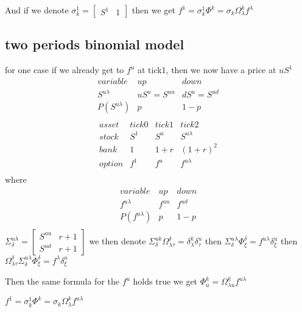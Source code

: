 \documentclass{article}
\theoremstyle{definition} %
\begin{document}
And if we denote
$\sigma^1_k=
    \begin{bmatrix}
        S^1 & 1
    \end{bmatrix}
$
then we get
$f^1=\sigma^1_k\Phi^k=\sigma_k\Omega_\lambda^kf^\lambda$

\subsection{two periods binomial model}
for one case if we already get to $f^u$
at tick1, then we now have a price at
$uS^1$
$$
    \begin{array}{c|ccc}
        variable        & up          & down        \\
        S^{u\lambda}    & uS^u=S^{uu} & dS^u=S^{ud} \\
        \hline
        P(S^{u\lambda}) & p           & 1-p         \\
    \end{array}
$$
$$
    \begin{array}{c|ccc}
        asset  & tick0 & tick1 & tick2        \\
        stock  & S^1   & S^u   & S^{u\lambda} \\
        \hline
        bank   & 1     & 1+r   & (1+r)^2      \\
        \hline
        option & f^1   & f^u   & f^{u\lambda} \\
    \end{array}
$$
where
$$
    \begin{array}{c|ccc}
        variable        & up     & down   \\
        f^{u\lambda}    & f^{uu} & f^{ud} \\
        \hline
        P(f^{u\lambda}) & p      & 1-p    \\
    \end{array}
$$
$\Sigma^{u\lambda}_\delta=
    \begin{bmatrix}
        S^{uu} & r+1 \\
        S^{ud} & r+1
    \end{bmatrix}
$
we then denote $\Sigma^{uk}_\delta \Omega_{\lambda\tau}^\delta=\delta^k_\lambda\delta^u_\tau$
then
$\Sigma^{u\lambda}_\delta \Phi^\delta_\xi=f^{u\lambda}\delta^u_\xi$
then
$\Omega_{\lambda\tau}^\delta\Sigma^{u\lambda}_\delta \Phi^\delta_\xi=f^\lambda\delta^u_\xi$

Then the same formula for the $f^u$ holds true
we get
$\Phi^k_u=\Omega_{\lambda u}^kf^{u\lambda}$

$f^1=\sigma^1_k\Phi^k=\sigma_k\Omega_\lambda^kf^{u\lambda}$
\end{document}

